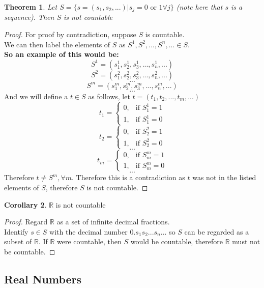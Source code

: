\documentclass[12pt]{article}
\theoremstyle{plain}
\newtheorem{theorem}{Theorem}[section]
\theoremstyle{definition}
\newtheorem{corollary}[theorem]{Corollary}
\begin{document}
\begin{theorem}
	Let $S = \{ s=(s_1, s_2, ...) | s_j = 0 \text{ or } 1 \forall j \}$ (note here that $s$ is a sequence). Then $S$ is not countable
\end{theorem}

\begin{proof}
	For proof by contradiction, suppose $S$ is countable.\\
	We can then label the elements of $S$ as $S^1, S^2, ... , S^n, ... \in S$.\\
	\textbf{So an example of this would be:}\\
	$$S^1 = (s^1_1, s^1_2, s^1_3, ..., s^1_n, ...)$$
	$$S^2 = (s^2_1, s^2_2, s^2_3, ..., s^2_n, ...)$$
	$$...$$
	$$S^m = (s^m_1, s^m_2, s^m_3, ..., s^m_n, ...)$$
	$$...$$
	And we will define a $t\in S$ as follows, let $t= (t_1, t_2,..., t_m, ...)$\\
	$$t_1 = \begin{cases}0, &\text{if $S^1_1=1$}\\
				1, &\text{if $S^1_1=0$}
				\end{cases}$$
	$$t_2 = \begin{cases}0, &\text{if $S^2_2=1$}\\
				1, &\text{if $S^2_2=0$}
				\end{cases}$$
	$$...$$
	$$t_m = \begin{cases}0, &\text{if $S^m_m=1$}\\
				1, &\text{if $S^m_m=0$}
				\end{cases}$$
	$$...$$
	Therefore $t \neq S^m, \forall m$. Therefore this is a contradiction as $t$ was not in the listed elements of $S$, therefore $S$ is not countable.
\end{proof}

\begin{corollary}
	$\mathbb{R}$ is not countable
\end{corollary}

\begin{proof}
	Regard $\mathbb{R}$ as a set of infinite decimal fractions.\\
	Identify $s\in S$ with the decimal number $0.s_1 s_2 ...s_n ...$ so $S$ can be regarded as a subset of $\mathbb{R}$. If $\mathbb{R}$ were countable, then $S$ would be countable, therefore $\mathbb{R}$ must not be countable.
\end{proof}

\subsection{Real Numbers}
\end{document}

